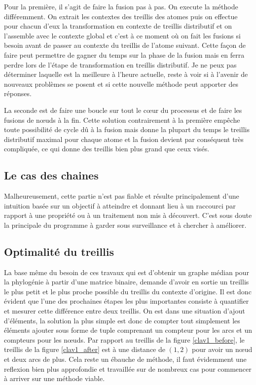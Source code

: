 \smallbreak

Pour la première, il s'agit de faire la fusion pas à pas. On execute la méthode différemment. On extrait les contextes des treillis des atomes puis on effectue pour chacun d'eux la transformation en contexte de treillis distributif et on l'assemble avec le contexte global et c'est à ce moment où on fait les fusions si besoin avant de passer au contexte du treillis de l'atome suivant. Cette façon de faire peut permettre de gagner du temps sur la phase de la fusion mais en ferra perdre lors de l'étape de transformation en treillis distributif. Je ne peux pas déterminer laquelle est la meilleure à l'heure actuelle, reste à voir si à l'avenir de nouveaux problèmes se posent et si cette nouvelle méthode peut apporter des réponses.

\smallbreak

La seconde est de faire une boucle sur tout le c\oe ur du processus et de faire les fusions de n\oe uds à la fin. Cette solution contrairement à la première empêche toute possibilité de cycle dû à la fusion mais donne la plupart du temps le treillis distributif maximal pour chaque atome et la fusion devient par conséquent très compliquée, ce qui donne des treillis bien plus grand que ceux visés.

\subsection{Le cas des chaines}

Malheureusement, cette partie n'est pas fiable et résulte principalement d'une intuition basée sur un objectif à atteindre et donnant lieu à un raccourci par rapport à une propriété ou à un traitement non mis à découvert. C'est sous doute la principale du programme à garder sous surveillance et à chercher à améliorer.

\subsection{Optimalité du treillis}

La base même du besoin de ces travaux qui est d'obtenir un graphe médian pour la phylogénie à partir d'une matrice binaire, demande d'avoir en sortie un treillis le plus petit et le plus proche possible du treillis du contexte d'origine. Il est donc évident que l'une des prochaines étapes les plus importantes consiste à quantifier et mesurer cette différence entre deux treillis. On est dans une situation d'ajout d'éléments, la solution la plus simple est donc de compter tout simplement les éléments ajouter sous forme de tuple comprenant un compteur pour les arcs et un compteurs pour les n\oe uds. Par rapport au treillis de la figure \ref{clav1_before}, le treillis de la figure \ref{clav1_after} est à une distance de $(1, 2)$ pour avoir un n\oe ud et deux arcs de plus. Cela reste un ébauche de méthode, il faut évidemment une reflexion bien plus approfondie et travaillée sur de nombreux cas pour commencer à arriver sur une méthode viable.

